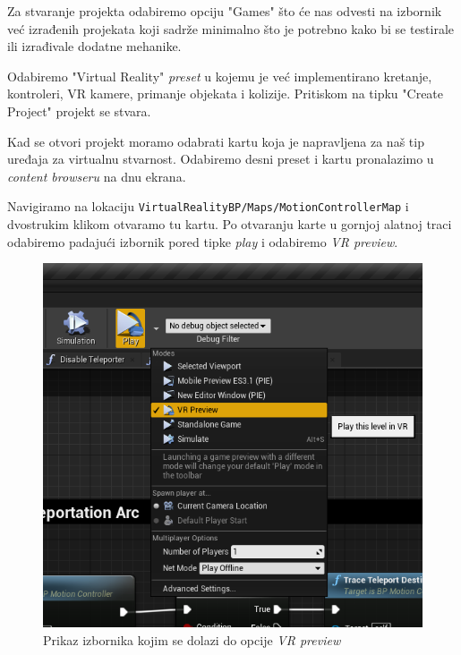 \documentclass[a4paper,10pt]{article}
\begin{document}
\marginpar{\color{teal}{\small Stvaranje prvog projekta moglo bi
potrajati znatno duže nego inače jer se mnogi resursi sad generiraju.
Dulje učitavanje može se očekivati i nakon ažuriranja na noviju verziju.}}

Za stvaranje projekta odabiremo opciju "Games" što će nas odvesti na izbornik
već izrađenih projekata koji sadrže minimalno što je potrebno kako bi se
testirale ili izrađivale dodatne mehanike.

Odabiremo "Virtual Reality" \textit{preset} u kojemu je već implementirano
kretanje, kontroleri, VR kamere, primanje objekata i kolizije. Pritiskom na
tipku "Create Project" projekt se stvara.

Kad se otvori projekt moramo odabrati kartu koja je napravljena za naš tip
uređaja za virtualnu stvarnost. Odabiremo desni preset i kartu pronalazimo u
\textit{content browseru} na dnu ekrana.

Navigiramo na lokaciju \texttt{VirtualRealityBP/Maps/MotionControllerMap} i dvostrukim klikom otvaramo tu kartu.
Po otvaranju karte u gornjoj alatnoj traci odabiremo padajući izbornik pored
tipke \textit{play}
i odabiremo \textit{VR preview}.


\begin{figure}[!h]
	\centering
	\includegraphics[width=\textwidth]{slike/R_slika7.1.png}
	\caption{Prikaz izbornika kojim se dolazi do opcije \textit{VR preview}}
\end{figure}
\end{document}
